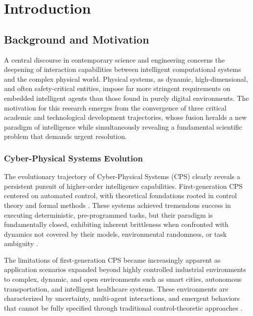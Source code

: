 
\chapter{Introduction} \label{chp:intro}

\section{Background and Motivation}

A central discourse in contemporary science and engineering concerns the deepening of interaction capabilities between intelligent computational systems and the complex physical world. Physical systems, as dynamic, high-dimensional, and often safety-critical entities, impose far more stringent requirements on embedded intelligent agents than those found in purely digital environments. The motivation for this research emerges from the convergence of three critical academic and technological development trajectories, whose fusion heralds a new paradigm of intelligence while simultaneously revealing a fundamental scientific problem that demands urgent resolution.

\subsection{Cyber-Physical Systems Evolution}

The evolutionary trajectory of Cyber-Physical Systems (CPS) clearly reveals a persistent pursuit of higher-order intelligence capabilities. First-generation CPS centered on automated control, with theoretical foundations rooted in control theory and formal methods \cite{lee2008cyber, rajkumar2010cyber}. These systems achieved tremendous success in executing deterministic, pre-programmed tasks, but their paradigm is fundamentally closed, exhibiting inherent brittleness when confronted with dynamics not covered by their models, environmental randomness, or task ambiguity \cite{baheti2011cyber, kim2012cyber}.

The limitations of first-generation CPS became increasingly apparent as application scenarios expanded beyond highly controlled industrial environments to complex, dynamic, and open environments such as smart cities, autonomous transportation, and intelligent healthcare systems. These environments are characterized by uncertainty, multi-agent interactions, and emergent behaviors that cannot be fully specified through traditional control-theoretic approaches \cite{doyle1989robust, zhou1996robust}.

